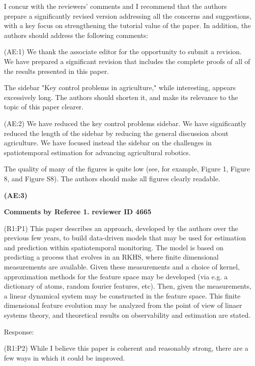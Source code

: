 \documentclass{letter}
\begin{document}
 I concur with the reviewers’ comments and I recommend that the authors
prepare a significantly revised version addressing all the
concerns and suggestions, with a key focus on strengthening the
tutorial value of the paper. In addition, the authors should address
the following comments:

{\color{red}(AE:1)} We thank the associate editor for the opportunity to submit a revision.  We have prepared a significant revision that includes the complete proofs of all of the results presented in this paper. 


The sidebar "Key control problems in agriculture," while
interesting, appears excessively long. The authors should shorten it,
and make its relevance to the topic of this paper clearer.

{\color{red}(AE:2)} We have reduced the key control problems sidebar. We have significantly reduced the length of the sidebar by reducing the general discussion about agriculture. We have focused instead the sidebar on the challenges in spatiotemporal estimation for advancing agricultural robotics.


The quality of many of the figures is quite low (see, for example,
Figure 1, Figure 8, and Figure S8). The authors should make all figures
clearly readable.

\textbf{(AE:3)} 


{\bf Comments by Referee 1. reviewer ID 4665}

{\color{red}(R1:P1)} This paper describes an approach, developed by the authors over the
previous few years, to build data-driven models that may be used for
estimation and prediction within spatiotemporal monitoring. The model
is based on predicting a process that evolves in an RKHS, where finite
dimensional measurements are available. Given these measurements and a
choice of kernel, approximation methods for the feature space may be
developed (via e.g. a dictionary of atoms, random fourier features,
etc). Then, given the measurements, a linear dynamical system may be
constructed in the feature space. This finite dimensional feature
evolution may be analyzed from the point of view of linaer systems
theory, and theoretical results on observability and estimation are
stated. 

{\color{red} Response:}


{\color{red}(R1:P2)} While I believe this paper is coherent and reasonably strong, there are
a few ways in which it could be improved. 
\end{document}
